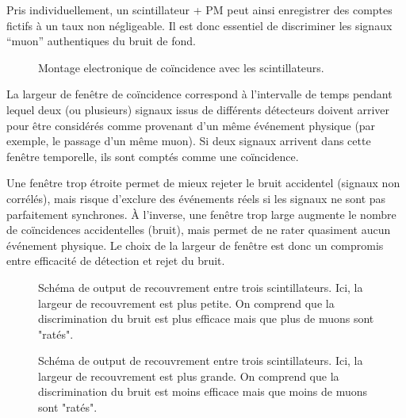 \documentclass[a4paper,12pt,twoside]{article}
\begin{document}
Pris individuellement, un scintillateur + PM peut ainsi enregistrer des comptes fictifs à un taux non négligeable.
 Il est donc essentiel de discriminer les signaux “muon” authentiques du bruit de fond.

\begin{figure}[H]
    \centering
    
    \caption{Montage electronique de coïncidence avec les scintillateurs.}
    \label{fig:coincidence_sans_delais}
\end{figure}


La largeur de fenêtre de coïncidence correspond à l'intervalle de temps pendant lequel deux (ou plusieurs) signaux issus de différents détecteurs doivent arriver pour être considérés comme provenant d'un même événement physique (par exemple, le passage d'un même muon). Si deux signaux arrivent dans cette fenêtre temporelle, ils sont comptés comme une coïncidence. 

Une fenêtre trop étroite permet de mieux rejeter le bruit accidentel (signaux non corrélés), mais risque d'exclure des événements réels si les signaux ne sont pas parfaitement synchrones. À l'inverse, une fenêtre trop large augmente le nombre de coïncidences accidentelles (bruit), mais permet de ne rater quasiment aucun événement physique. Le choix de la largeur de fenêtre est donc un compromis entre efficacité de détection et rejet du bruit.

\begin{figure}[H]
  \begin{minipage}[t]{0.48\textwidth}
    \centering
    
    \caption{Schéma de output de recouvrement entre trois scintillateurs. Ici, la largeur de recouvrement est plus petite. On comprend que la discrimination du bruit est plus efficace mais que plus de muons sont "ratés".}
    \label{fig:recouvrement_petit_width}
  \end{minipage}
  \hfill
  \begin{minipage}[t]{0.48\textwidth} 
    \centering
    
    \caption{Schéma de output de recouvrement entre trois scintillateurs. Ici, la largeur de recouvrement est plus grande. On comprend que la discrimination du bruit est moins efficace mais que moins de muons sont "ratés".}
    \label{fig:recouvrment_grand_width}
  \end{minipage}
\end{figure}

\end{document}
